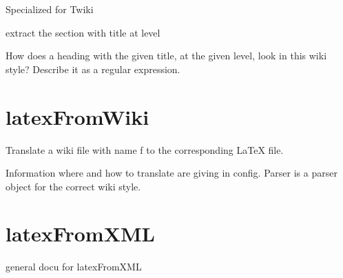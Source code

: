 \documentclass[a4paper,10pt,english]{sphinxmanual}
\begin{document}
\begin{fulllineitems}
\label{sourcecodedoc:wikiParser.wikiParserTwiki}
Specialized for Twiki

\begin{fulllineitems}
\label{sourcecodedoc:wikiParser.wikiParserTwiki.getSection}
extract the section with title at level

\end{fulllineitems}


\begin{fulllineitems}
\label{sourcecodedoc:wikiParser.wikiParserTwiki.localHeading}
How does a heading with the given title, at the given level,
look in this wiki style? Describe it as a regular expression.

\end{fulllineitems}


\end{fulllineitems}



\section{latexFromWiki}
\label{sourcecodedoc:module-latexFromWiki}\label{sourcecodedoc:latexfromwiki}

\begin{fulllineitems}
\label{sourcecodedoc:latexFromWiki.handleFile}
Translate a wiki file with name f to the corresponding LaTeX file.

Information where and how to translate are giving in config. Parser is
a parser object for the correct wiki style.

\end{fulllineitems}



\section{latexFromXML}
\label{sourcecodedoc:latexfromxml}\label{sourcecodedoc:module-latexFromXML}
general docu for latexFromXML
\end{document}
